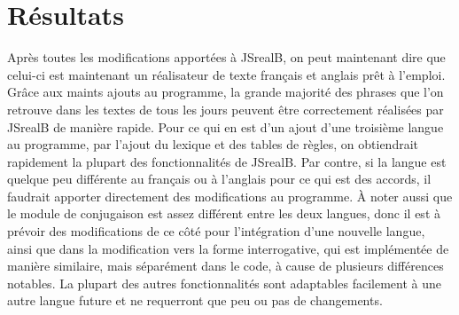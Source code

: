 \documentclass[11pt]{article} %
\newcommand{\system}[1]{\textsf{#1}}
\newcommand{\JSB}{\system{JSrealB}}
\begin{document}
\section{Résultats}
Après toutes les modifications apportées à \JSB{}, on peut maintenant
dire que celui-ci est maintenant un réalisateur de texte français et anglais
prêt à l'emploi. Grâce aux maints ajouts au programme, la grande majorité
des phrases que l'on retrouve dans les textes de tous les jours peuvent
être correctement réalisées par \JSB{} de manière rapide. Pour ce
qui en est d'un ajout d'une troisième langue au programme, par l'ajout
du lexique et des tables de règles, on obtiendrait rapidement la plupart
des fonctionnalités de \JSB{}. Par contre, si la langue est quelque
peu différente au français ou à l'anglais pour ce qui est des accords,
il faudrait apporter directement des modifications au programme. À
noter aussi que le module de conjugaison est assez différent entre
les deux langues, donc il est à prévoir des modifications de ce côté
pour l'intégration d'une nouvelle langue, ainsi que dans la modification
vers la forme interrogative, qui est implémentée de manière similaire,
mais séparément dans le code, à cause de plusieurs différences notables.
La plupart des autres fonctionnalités sont adaptables facilement à
une autre langue future et ne requerront que peu ou pas de changements.
\end{document}
